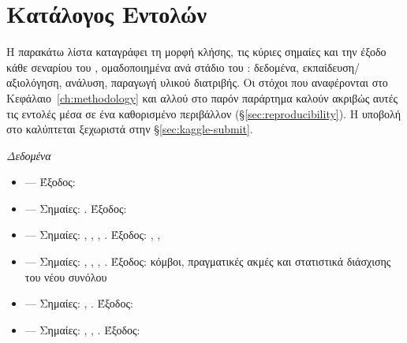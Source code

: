 \section{Κατάλογος Εντολών}
\label{sec:cli-reference}

Η παρακάτω λίστα καταγράφει τη μορφή κλήσης, τις κύριες σημαίες και την
έξοδο κάθε σεναρίου του \texttt{}, ομαδοποιημένα ανά στάδιο του :
δεδομένα, εκπαίδευση/\allowbreak{}αξιολόγηση, ανάλυση, παραγωγή υλικού διατριβής.
Οι στόχοι \texttt{}
που αναφέρονται στο Κεφάλαιο~\ref{ch:methodology} και αλλού στο παρόν παράρτημα καλούν ακριβώς
αυτές τις εντολές μέσα σε ένα καθορισμένο περιβάλλον  (\S\ref{sec:reproducibility}).
Η υποβολή στο  καλύπτεται ξεχωριστά στην \S\ref{sec:kaggle-submit}.

\textit{Δεδομένα}

\begin{itemize}
  \item \texttt{} --- Έξοδος:
    \texttt{}
  \item \texttt{} --- Σημαίες:
    \texttt{}.
    Έξοδος:
    \texttt{}
  \item \texttt{} --- Σημαίες:
    \texttt{}, \texttt{}, \texttt{}, \texttt{}.
    Έξοδος: \texttt{}, \texttt{},
    \texttt{}
  \item \texttt{} --- Σημαίες:
    \texttt{}, \texttt{},
    \texttt{}, \texttt{}.
    Έξοδος: κόμβοι,
    πραγματικές ακμές και στατιστικά διάσχισης του νέου συνόλου
  \item \texttt{} --- Σημαίες:
    \texttt{}, \texttt{}.
    Έξοδος:
    \texttt{}
  \item \texttt{} --- Σημαίες:
    \texttt{}, \texttt{},
    \texttt{}.
    Έξοδος: \texttt{}
\end{itemize}

